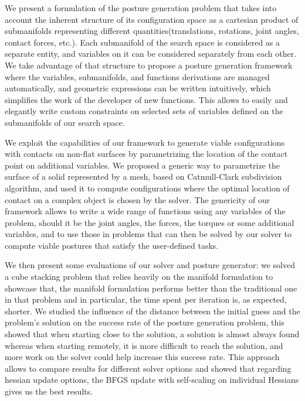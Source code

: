 We present a formulation of the posture generation problem that takes into account the inherent structure of its configuration space as a cartesian product of submanifolds representing different quantities(translations, rotations, joint angles, contact forces, etc.).
Each submanifold of the search space is considered as a separate entity, and variables on it can be considered separately from each other.
We take advantage of that structure to propose a posture generation framework where the variables, submanifolds, and functions derivations are managed automatically, and geometric expressions can be written intuitively, which simplifies the work of the developer of new functions.
This allows to easily and elegantly write custom constraints on selected sets of variables defined on the submanifolds of our search space.

We exploit the capabilities of our framework to generate viable configurations with contacts on non-flat surfaces by parametrizing the location of the contact point on additional variables.
We proposed a generic way to parametrize the surface of a solid represented by a mesh, based on Catmull-Clark subdivision algorithm, and used it to compute configurations where the optimal location of contact on a complex object is chosen by the solver.
The genericity of our framework allows to write a wide range of functions using any variables of the problem, should it be the joint angles, the forces, the torques or some additional variables, and to use those in problems that can then be solved by our solver to compute viable postures that satisfy the user-defined tasks.

We then present some evaluations of our solver and posture generator: we solved a cube stacking problem that relies heavily on the manifold formulation to showcase that, the manifold formulation performs better than the traditional one in that problem and in particular, the time spent per iteration is, as expected, shorter.
We studied the influence of the distance between the initial guess and the problem's solution on the success rate of the posture generation problem, this showed that when starting close to the solution, a solution is almost always found whereas when starting remotely, it is more difficult to reach the solution, and more work on the solver could help increase this success rate.
This approach allows to compare results for different solver options and showed that regarding hessian update options, the BFGS update with self-scaling on individual Hessians gives us the best results.


